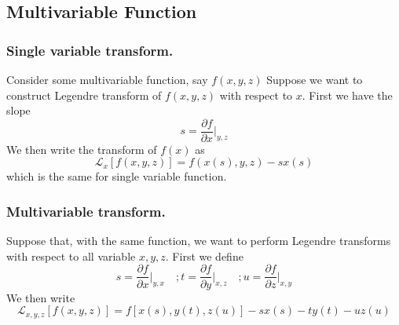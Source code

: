 \documentclass[../../../Main.tex]{subfiles}
\begin{document}
\subsection{Multivariable Function}
\subsubsection{Single variable transform.} Consider some multivariable function, say $f(x,y,z)$ Suppose we want to construct Legendre transform of $f(x,y,z)$ with respect to $x$. First we have the slope
\begin{equation*}
    s=\frac{\partial f}{\partial x}\bigg|_{y,z}
\end{equation*}
We then write the transform of $f(x)$ as 
\begin{equation*}
    \mathcal{L}_x[f(x,y,z)] = f(x(s),y,z)-sx(s)
\end{equation*}
which is the same for single variable function.

\subsubsection{Multivariable transform.} Suppose that, with the same function, we want to perform Legendre transforms with respect to all variable $x,y,z$. First we define
\begin{equation*}
    s=\frac{\partial f}{\partial x}\bigg|_{y,x}\quad ; t=\frac{\partial f}{\partial y}\bigg|_{x,z}\quad ;u=\frac{\partial f}{\partial z}\bigg|_{x,y}
\end{equation*}
We then write
\begin{equation*}
    \mathcal{L}_{x,y,z}[f(x,y,z)] = f[x(s),y(t),z(u)]-sx(s)-ty(t)-uz(u)
\end{equation*}
\end{document}
